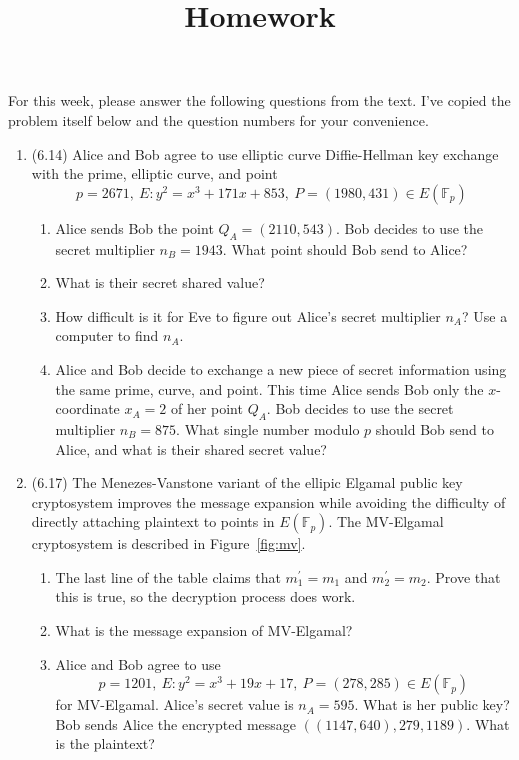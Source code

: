 \documentclass[12pt]{amsart}
\theoremstyle{definition}
\begin{document}
\title{Homework}

\maketitle

For this week, please answer the following questions from the text. 
I've copied the problem itself below and the question numbers for 
your convenience. 

\begin{enumerate}
	\item (6.14) Alice and Bob agree to use elliptic curve 
		Diffie-Hellman key exchange with the prime, elliptic 
		curve, and point
	\begin{displaymath}
		p = 2671,~ E: y^2 = x^3 + 171x + 853,~ P = (1980,431) 
		\in E(\mathbb{F}_p) 
	\end{displaymath}
	\begin{enumerate}
		\item Alice sends Bob the point $Q_A = (2110,543)$. Bob 
			decides to use the secret multiplier $n_B = 
			1943$. What point should Bob send to Alice?
		\item What is their secret shared value? 
		\item How difficult is it for Eve to figure out Alice's 
			secret multiplier $n_A$? Use a computer to 
			find $n_A$.
		\item Alice and Bob decide to exchange a new piece of 
			secret information using the same prime, curve, and 
			point. This time Alice sends Bob only the $x$-
			coordinate $x_A = 2$ of her point $Q_A$. Bob decides 
			to use the secret multiplier $n_B = 875$. What 
			single number modulo $p$ should Bob send to 
			Alice, and what is their shared secret value?
	\end{enumerate}
	\item (6.17) The Menezes-Vanstone variant of the ellipic Elgamal 
		public key cryptosystem improves the message expansion 
		while avoiding the difficulty of directly attaching 
		plaintext to points in $E(\mathbb{F}_p)$. The MV-Elgamal 
		cryptosystem is described in Figure~\ref{fig:mv}. 
	\begin{enumerate}
		\item The last line of the table claims that $m_1^\prime = 
			m_1$ and $m_2^\prime = m_2$. Prove that this is 
			true, so the decryption process does work. 
		\item What is the message expansion of MV-Elgamal?
		\item Alice and Bob agree to use 
		\begin{displaymath}
			p=1201,~ E:y^2 = x^3 + 19x + 17,~ P = (278,285) \in 
			E(\mathbb{F}_p)
		\end{displaymath}
			for MV-Elgamal. Alice's secret value is $n_A = 595$. 
			What is her public key? Bob sends Alice the encrypted 
			message $((1147,640),279,1189)$. What is the plaintext?
	\end{enumerate}
		

\end{enumerate}
\end{document}
